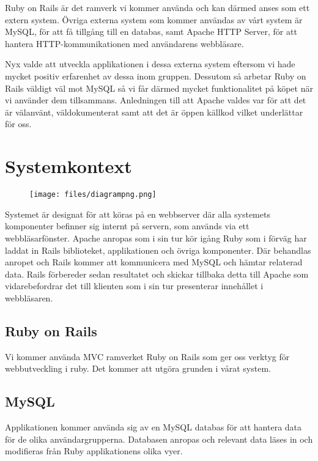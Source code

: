 \documentclass[a4paper, twoside, 11pt, titlepage]{article}
\begin{document}
Ruby on Rails är det ramverk vi kommer använda och kan därmed anses som ett extern system. Övriga externa system som kommer användas av vårt system är MySQL, för att få tillgång till en databas, samt Apache HTTP Server, för att hantera HTTP-kommunikationen med användarens webbläsare.

Nyx valde att utveckla applikationen i dessa externa system eftersom vi hade mycket positiv erfarenhet av dessa inom gruppen. Dessutom så arbetar Ruby on Rails väldigt väl mot MySQL så vi får därmed mycket funktionalitet på köpet när vi använder dem tillsammans. Anledningen till att Apache valdes var för att det är välanvänt, väldokumenterat samt att det är öppen källkod vilket underlättar för oss.

\clearpage
\section{Systemkontext}


\begin{figure}[ht] \centering \texttt{[image: files/diagrampng.png]} \end{figure} \FloatBarrier

Systemet är designat för att köras på en webbserver där alla systemets komponenter befinner sig internt  på servern, som används via ett webbläsarfönster. Apache anropas som i sin tur kör igång Ruby som i förväg har laddat in Rails biblioteket, applikationen och övriga komponenter. Där behandlas anropet och Rails kommer att kommunicera med MySQL och hämtar relaterad data. Rails förbereder sedan resultatet och skickar tillbaka detta till Apache som vidarebefordrar det till klienten som i sin tur presenterar innehållet i webbläsaren.

	\subsection{Ruby on Rails}


	Vi kommer använda MVC ramverket Ruby on Rails som ger oss verktyg för webbutveckling i ruby. Det kommer att utgöra grunden i vårat system.

	\subsection{MySQL}


	Applikationen kommer använda sig av en MySQL databas för att hantera data för de olika användargrupperna. Databasen anropas och relevant data läses in och modifieras från Ruby applikationens olika vyer.
\end{document}
